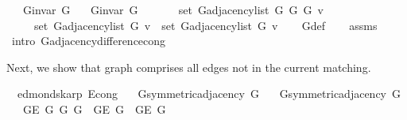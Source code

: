 \begin{isabellebody}
\ \ \ {\isachardoublequoteopen}G{\isachardot}{\kern0pt}invar\ G{\isachardoublequoteclose}\isanewline
\ \ \ {\isachardoublequoteopen}G{\isachardot}{\kern0pt}invar\ G{\isacharprime}{\kern0pt}{\isachardoublequoteclose}\isanewline
\ \ \isanewline
\ \ \ \ {\isachardoublequoteopen}set\ {\isacharparenleft}{\kern0pt}G{\isachardot}{\kern0pt}adjacency{\isacharunderscore}{\kern0pt}list\ {\isacharparenleft}{\kern0pt}G{}\ G\ G{\isacharprime}{\kern0pt}{\isacharparenright}{\kern0pt}\ v{\isacharparenright}{\kern0pt}\ {\isacharequal}{\kern0pt}\isanewline
\ \ \ \ \ set\ {\isacharparenleft}{\kern0pt}G{\isachardot}{\kern0pt}adjacency{\isacharunderscore}{\kern0pt}list\ G\ v{\isacharparenright}{\kern0pt}\ {\isacharminus}{\kern0pt}\ set\ {\isacharparenleft}{\kern0pt}G{\isachardot}{\kern0pt}adjacency{\isacharunderscore}{\kern0pt}list\ G{\isacharprime}{\kern0pt}\ v{\isacharparenright}{\kern0pt}{\isachardoublequoteclose}%
\endisataginvisible
{\isafoldinvisible}%
%
\isadeliminvisible
\isanewline
%
\endisadeliminvisible
%
\isadelimproof
\ \ %
\endisadelimproof
%
\isatagproof
{}\isamarkupfalse%
\ G{}{\isacharunderscore}{\kern0pt}def\isanewline
\ \ \isamarkupfalse%
\ assms\isanewline
\ \ \isamarkupfalse%
\ {\isacharparenleft}{\kern0pt}intro\ G{\isachardot}{\kern0pt}adjacency{\isacharunderscore}{\kern0pt}difference{\isacharunderscore}{\kern0pt}cong{\isacharparenright}{\kern0pt}%
\endisatagproof
{\isafoldproof}%
%
\isadelimproof
%
\endisadelimproof
%
\begin{isamarkuptext}%
Next, we show that graph  comprises all edges not in the current matching.%
\end{isamarkuptext}\isamarkuptrue%
\isamarkupfalse%
\ {\isacharparenleft}{\kern0pt}\ edmonds{\isacharunderscore}{\kern0pt}karp{\isacharparenright}{\kern0pt}\ E{}{\isacharunderscore}{\kern0pt}cong{\isacharcolon}{\kern0pt}\isanewline
\ \ \ {\isachardoublequoteopen}G{\isachardot}{\kern0pt}symmetric{\isacharunderscore}{\kern0pt}adjacency{\isacharprime}{\kern0pt}\ G{\isachardoublequoteclose}\isanewline
\ \ \ {\isachardoublequoteopen}G{\isachardot}{\kern0pt}symmetric{\isacharunderscore}{\kern0pt}adjacency{\isacharprime}{\kern0pt}\ G{\isacharprime}{\kern0pt}{\isachardoublequoteclose}\isanewline
\ \ \ {\isachardoublequoteopen}G{\isachardot}{\kern0pt}E\ {\isacharparenleft}{\kern0pt}G{}\ G\ G{\isacharprime}{\kern0pt}{\isacharparenright}{\kern0pt}\ {\isacharequal}{\kern0pt}\ G{\isachardot}{\kern0pt}E\ G\ {\isacharminus}{\kern0pt}\ G{\isachardot}{\kern0pt}E\ G{\isacharprime}{\kern0pt}{\isachardoublequoteclose}\isanewline

\end{isabellebody}
